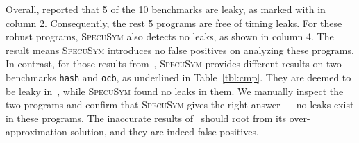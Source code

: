 \documentclass[sigconf,screen]{acmart}
\newcommand{\SpecuSym}{\textsc{SpecuSym} }
\begin{document}
\begin{table}
\caption{Comparison betwee Wu et al.~\cite{WuW19} and \SpecuSym}
\label{tbl:cmp}
\centering
{}
\end{table}




Overall, \cite{WuW19} reported that 5 of the 10 benchmarks are leaky, as marked 
with  in column 2. Consequently, the rest 5 programs are free of timing 
leaks. For these robust programs, \SpecuSym also detects no leaks, as shown in 
column 4. The result means \SpecuSym introduces no false positives on analyzing 
these programs. In contrast, for those  results from~\cite{WuW19}, 
\SpecuSym provides different results on two benchmarks \texttt{hash} and \texttt{ocb}, 
as underlined in Table~\ref{tbl:cmp}. They are deemed to be leaky in~\cite{WuW19},
while \SpecuSym found no leaks in them. We manually inspect the two programs and 
confirm that \SpecuSym gives the right answer --- no leaks exist in these programs. 
The inaccurate results of~\cite{WuW19} should root from its over-approximation 
solution, and they are indeed false positives.
\end{document}
